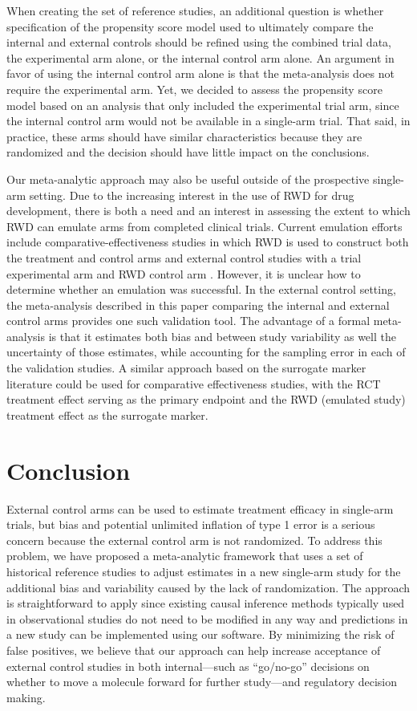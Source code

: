 \documentclass[11pt,final,fleqn]{article}\usepackage[]{graphicx}\usepackage[]{color}
\begin{document}
When creating the set of reference studies, an additional question is whether specification of the propensity score model used to ultimately compare the internal and external controls should be refined using the combined trial data, the experimental arm alone, or the internal control arm alone. An argument in favor of using the internal control arm alone is that the meta-analysis does not require the experimental arm. Yet, we decided to assess the propensity score model based on an analysis that only included the experimental trial arm, since the internal control arm would not be available in a single-arm trial. That said, in practice, these arms should have similar characteristics because they are randomized and the decision should have little impact on the conclusions. 

Our meta-analytic approach may also be useful outside of the prospective single-arm setting. Due to the increasing interest in the use of RWD for drug development, there is both a need and an interest in assessing the extent to which RWD can emulate arms from completed clinical trials. Current emulation efforts include comparative-effectiveness studies \cite{franklin2021emulating} in which RWD is used to construct both the treatment and control arms and external control studies with a trial experimental arm and RWD control arm \cite{carrigan2020using}. However, it is unclear how to determine whether an emulation was successful. In the external control setting, the meta-analysis described in this paper comparing the internal and external control arms provides one such validation tool. The advantage of a formal meta-analysis is that it estimates both bias and between study variability as well the uncertainty of those estimates, while accounting for the sampling error in each of the validation studies. A similar approach based on the surrogate marker literature could be used for comparative effectiveness studies, with the RCT treatment effect serving as the primary endpoint and the RWD (emulated study) treatment effect as the surrogate marker.

\section{Conclusion} \label{sec:conclusion}
External control arms can be used to estimate treatment efficacy in single-arm trials, but bias and potential unlimited inflation of type 1 error is a serious concern because the external control arm is not randomized. To address this problem, we have proposed a meta-analytic framework that uses a set of historical reference studies to adjust estimates in a new single-arm study for the additional bias and variability caused by the lack of randomization. The approach is straightforward to apply since existing causal inference methods typically used in observational studies do not need to be modified in any way and predictions in a new study can be implemented using our software. By minimizing the risk of false positives, we believe that our approach can help increase acceptance of external control studies in both internal---such as ``go/no-go'' decisions on whether to move a molecule forward for further study---and regulatory decision making.
\end{document}
